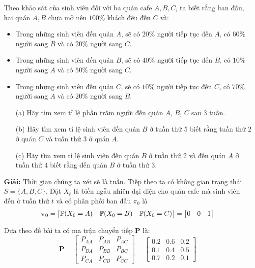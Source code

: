 \begin{probvn}
    Theo khảo sát của sinh viên đối với ba quán cafe $A, B, C$, ta biết rằng ban đầu, hai quán $A, B$ chưa mở nên $100\%$ khách đều đến $C$ và:
    \begin{itemize}
        \item Trong những sinh viên đến quán $A$, sẽ có $20\%$ người tiếp tục đến $A$, có $60\%$ người sang $B$ và có $20\%$ người sang $C$.
        \item Trong những sinh viên đến quán $B$, sẽ có $40\%$ người tiếp tục đến $B$, có $10\%$ người sang $A$ và có $50\%$ người sang $C$.
        \item Trong những sinh viên đến quán $C$, sẽ có $10\%$ người tiếp tục đến $C$, có $70\%$ người sang $A$ và có $20\%$ người sang $B$.
    \end{itemize}

    \begin{itemize}
        \item[(a)] Hãy tìm xem tỉ lệ phần trăm người đến quán $A$, $B$, $C$ sau 3 tuần.
        \item[(b)] Hãy tìm xem tỉ lệ sinh viên đến quán $B$ ở tuần thứ 5 biết rằng tuần thứ 2 ở quán $C$ và tuần thứ 3 ở quán $A$.
        \item[(c)] Hãy tìm xem tỉ lệ sinh viên đến quán $B$ ở tuần thứ 2 và đến quán $A$ ở tuần thứ 4 biết rằng đến quán $B$ ở tuần thứ 3.
    \end{itemize}
\end{probvn}

\noindent \textbf{Giải:} Thời gian chúng ta xét sẽ là tuần. Tiếp theo ta có không gian trạng thái $S = \{A, B, C \}$. Đặt $X_t$ là biến ngẫu nhiên đại diện cho quán cafe mà sinh viên đến ở tuần thứ $t$ và có phân phối ban đầu $\pi_0$ là
$$
\pi_0 = \begin{bmatrix}
\P(X_0 = A) & \P(X_0 = B) & \P(X_0 = C) 
\end{bmatrix} = \begin{bmatrix}
    0 & 0 & 1
\end{bmatrix}
$$

\noindent Dựa theo đề bài ta có ma trận chuyển tiếp $\mathbf{P}$ là:
$$
\mathbf{P} = \begin{bmatrix}
    P_{AA} & P_{AB} & P_{AC} \\
    P_{BA} & P_{BB} & P_{BC} \\
    P_{CA} & P_{CB} & P_{CC}
\end{bmatrix} = \begin{bmatrix}
    0.2 & 0.6 & 0.2 \\
    0.1 & 0.4 & 0.5 \\
    0.7 & 0.2 & 0.1
\end{bmatrix}
$$

